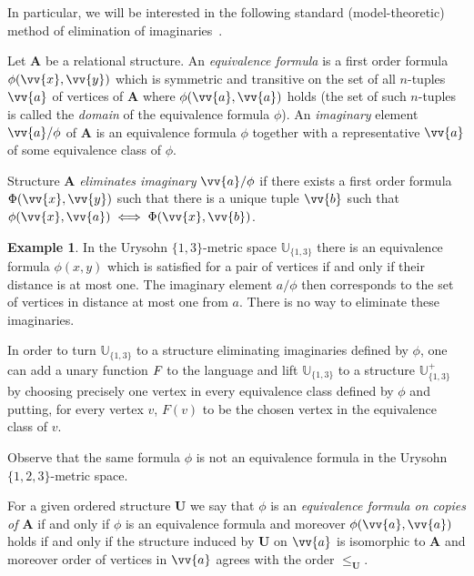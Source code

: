 \documentclass{elsarticle}
\def\str#1{\mathbf {#1}}
\def\func#1#2{\nbfunc{\ifstrempty{#1}{}{\str{#1}}}{#2}}
\def\nbfunc#1#2{F\ifstrempty{#1}{}{_{#1}}\ifstrempty{#2}{}{^{#2}}}
\theoremstyle{plain}
\theoremstyle{definition}
\newtheorem{example}[theorem]{Example}
\theoremstyle{remark}
\begin{document}
In particular, we will be interested in the following standard (model-theoretic) method of elimination of imaginaries~\cite{Hodges1993,Shelah1978}.

Let $\str{A}$ be a relational structure.  An \emph{equivalence formula} is a
first order formula $\phi(\vv{x},\vv{y})$ which is symmetric and transitive on the set of
all $n$-tuples $\vv{a}$ of vertices of $\str{A}$ where
$\phi(\vv{a},\vv{a})$ holds (the set of such $n$-tuples is called the \emph{domain} of
the equivalence formula $\phi$). An \emph{imaginary} element $\vv{a}/\phi$ of
$\str{A}$ is an equivalence formula $\phi$ together with a representative
$\vv{a}$ of some equivalence class of $\phi$.

Structure $\str{A}$ \emph{eliminates  imaginary $\vv{a}/\phi$} if there
exists a first order formula $\Phi(\vv{x},\vv{y})$ such that there is a unique tuple $\vv{b}$
such that $\phi(\vv{x}, \vv{a}) \iff \Phi(\vv{x}, \vv{b})$.

\begin{example}
In the Urysohn $\{1,3\}$-metric space $\mathbb U_{\{1,3\}}$  there is an equivalence formula $\phi(x,y)$ which is satisfied for a pair of
vertices if and only if their distance is at most one.  The imaginary element $a/\phi$ then corresponds to the set of vertices in distance at most one from $a$. There is no way to eliminate
these imaginaries.

In order to turn $\mathbb U_{\{1,3\}}$ to a structure eliminating imaginaries defined by 
$\phi$, one can add a unary function $\func{}{}$ to the language 
and lift $\mathbb U_{\{1,3\}}$ to a structure $\mathbb U_{\{1,3\}}^+$ by
choosing precisely one vertex in every equivalence class defined by $\phi$ and putting, for every vertex $v$,
$F(v)$ to be the chosen vertex in the equivalence class of $v$.


Observe that the same formula $\phi$ is not an equivalence formula in the Urysohn $\{1,2,3\}$-metric space.
\end{example}

For a given ordered structure $\str{U}$ we say that $\phi$ is an \emph{equivalence formula on copies of $\str{A}$}
if and only if $\phi$ is an equivalence formula and moreover $\phi(\vv{a},\vv{a})$ holds if and only
if the structure induced by $\str{U}$ on $\vv{a}$ is isomorphic to $\str{A}$ and moreover order of vertices in $\vv{a}$
agrees with the order $\leq_\str{U}$.
\end{document}
